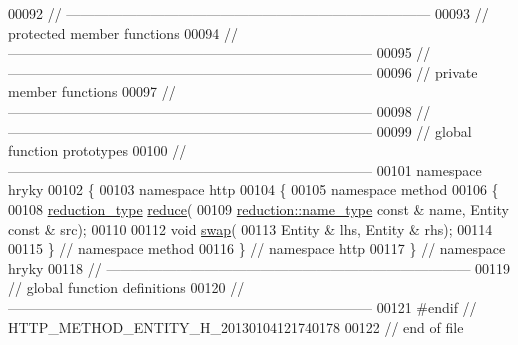 \begin{DoxyCode}
00092 \textcolor{comment}{//
      ------------------------------------------------------------------------------}
00093 \textcolor{comment}{// protected member functions}
00094 \textcolor{comment}{//
      ------------------------------------------------------------------------------}
00095 \textcolor{comment}{//
      ------------------------------------------------------------------------------}
00096 \textcolor{comment}{// private member functions}
00097 \textcolor{comment}{//
      ------------------------------------------------------------------------------}
00098 \textcolor{comment}{//
      ------------------------------------------------------------------------------}
00099 \textcolor{comment}{// global function prototypes}
00100 \textcolor{comment}{//
      ------------------------------------------------------------------------------}
00101 \textcolor{keyword}{namespace }hryky
00102 \{
00103 \textcolor{keyword}{namespace }http
00104 \{
00105 \textcolor{keyword}{namespace }method
00106 \{
00108     \hyperlink{namespacehryky_a343a9a4c36a586be5c2693156200eadc}{reduction_type} \hyperlink{namespacehryky_1_1http_a08fc36a78a8e2908140fcd102829a566}{reduce}(
00109         \hyperlink{namespacehryky_1_1reduction_ac686c30a4c8d196bbd0f05629a6b921f}{reduction::name_type} \textcolor{keyword}{const} & name, Entity \textcolor{keyword}{const} & src);
00110 
00112     \textcolor{keywordtype}{void} \hyperlink{namespacehryky_1_1http_a38e62595ad532d18fbc65ceb61973aec}{swap}(
00113         Entity & lhs, Entity & rhs);
00114 
00115 \} \textcolor{comment}{// namespace method}
00116 \} \textcolor{comment}{// namespace http}
00117 \} \textcolor{comment}{// namespace hryky}
00118 \textcolor{comment}{//
      ------------------------------------------------------------------------------}
00119 \textcolor{comment}{// global function definitions}
00120 \textcolor{comment}{//
      ------------------------------------------------------------------------------}
00121 \textcolor{preprocessor}{#endif // HTTP\_METHOD\_ENTITY\_H\_20130104121740178}
00122 \textcolor{preprocessor}{}\textcolor{comment}{// end of file}
\end{DoxyCode}
